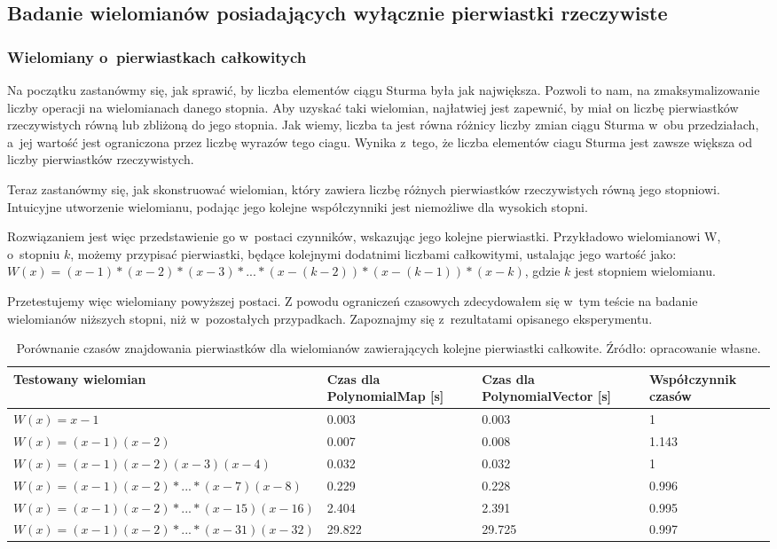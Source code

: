 \subsection{Badanie wielomianów posiadających wyłącznie pierwiastki rzeczywiste}

\subsubsection{Wielomiany o~pierwiastkach całkowitych}

Na początku zastanówmy się, jak sprawić, by liczba elementów ciągu Sturma była jak największa. Pozwoli to nam, na zmaksymalizowanie liczby operacji na wielomianach danego stopnia. Aby uzyskać taki wielomian, najłatwiej jest zapewnić, by miał on liczbę pierwiastków rzeczywistych równą lub zbliżoną do jego stopnia. Jak wiemy, liczba ta jest równa różnicy liczby zmian ciągu Sturma w~obu przedziałach, a~jej wartość jest ograniczona przez liczbę wyrazów tego ciagu. Wynika z~tego, że liczba elementów ciagu Sturma jest zawsze większa od liczby pierwiastków rzeczywistych.

Teraz zastanówmy się, jak skonstruować wielomian, który zawiera liczbę różnych pierwiastków rzeczywistych równą jego stopniowi. Intuicyjne utworzenie wielomianu, podając jego kolejne współczynniki jest niemożliwe dla wysokich stopni.

Rozwiązaniem jest więc przedstawienie go w~postaci czynników, wskazując jego kolejne pierwiastki. Przykładowo wielomianowi W, o~stopniu $k$, możemy przypisać pierwiastki, będące kolejnymi dodatnimi liczbami całkowitymi, ustalając jego wartość jako: \\ $W(x)=(x-1)*(x-2)*(x-3)*...*(x-(k-2))*(x-(k-1))*(x-k)$, gdzie $k$ jest stopniem wielomianu.

Przetestujemy więc wielomiany powyższej postaci. Z powodu ograniczeń czasowych zdecydowałem się w~tym teście na badanie wielomianów niższych stopni, niż w~pozostałych przypadkach. Zapoznajmy się z~rezultatami opisanego eksperymentu.

\begin{table}[H]
	\begin{tabular}{ |p{4cm}|p{2.75cm}|p{2.75cm}|p{3.5cm}|} 
		\hline
		Testowany wielomian & Czas dla PolynomialMap [s] & Czas dla PolynomialVector [s] & Współczynnik czasów \\
		\hline
		$W(x) = x-1$ & 0.003 & 0.003 & 1 \\
		$W(x) = (x-1)(x-2)$ & 0.007 & 0.008 & 1.143 \\
		$W(x) = (x-1)(x-2)(x-3)(x-4)$ & 0.032 & 0.032 & 1 \\
		$W(x) = (x-1)(x-2)*...*(x-7)(x-8)$ & 0.229 & 0.228 & 0.996 \\
		$W(x) = (x-1)(x-2)*...*(x-15)(x-16)$ & 2.404 & 2.391 & 0.995 \\
		$W(x) = (x-1)(x-2)*...*(x-31)(x-32)$ & 29.822 & 29.725 & 0.997 \\
		\hline
	\end{tabular}
	\caption{Porównanie czasów znajdowania pierwiastków dla wielomianów zawierających kolejne pierwiastki całkowite. Źródło: opracowanie własne.}
\end{table}


